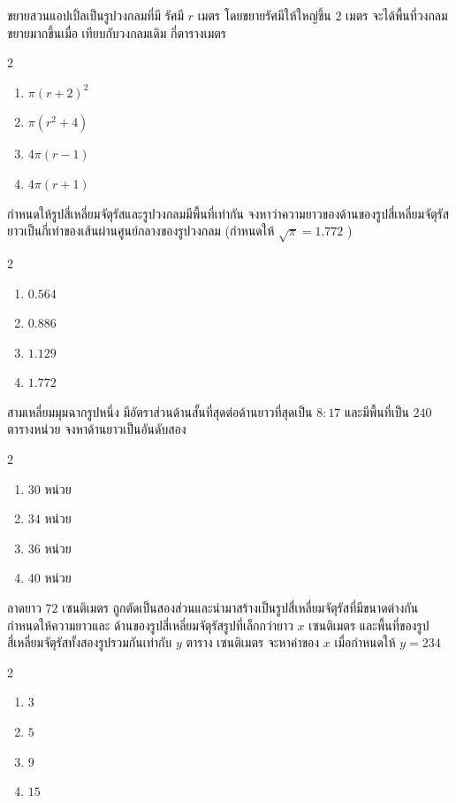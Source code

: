 \newpage
\begin{examplebox}
ขยายสวนแอปเปิ้ลเป็นรูปวงกลมที่มี รัศมี $r$ เมตร โดยขยายรัศมีให้ใหญ่ขึ้น $2$ เมตร จะได้พื้นที่วงกลมขยายมากขึ้นเมื่อ เทียบกับวงกลมเดิม กี่ตารางเมตร
\begin{multicols}{2} \begin{enumerate}
\item $\pi(r+2)^2$
\item $\pi\left(r^2+4\right)$
\item $4 \pi(r-1)$
\item $4 \pi(r+1)$
\end{enumerate} \end{multicols}
\end{examplebox}
\vspace{7cm}
\begin{examplebox}  
กำหนดให้รูปสี่เหลี่ยมจัตุรัสและรูปวงกลมมีพื้นที่เท่ากัน จงหาว่าความยาวของด้านของรูปสี่เหลี่ยมจัตุรัสยาวเป็นกี่เท่าของเส้นผ่านศูนย์กลางของรูปวงกลม (กำหนดให้ $\sqrt{\pi}=1.772$ )
\begin{multicols}{2} \begin{enumerate}
\item $0.564$
\item $ 0.886$
\item $1.129$
\item $1.772$
\end{enumerate} \end{multicols}
\end{examplebox}
\newpage

\begin{examplebox}
สามเหลี่ยมมุมฉากรูปหนึ่ง มีอัตราส่วนด้านสั้นที่สุดต่อด้านยาวที่สุดเป็น $8: 17$ และมีพื้นที่เป็น $240$ ตารางหน่วย จงหาด้านยาวเป็นอันดับสอง
\begin{multicols}{2} \begin{enumerate}
\item $30$ หน่วย
\item $34$ หน่วย
\item $36$ หน่วย
\item $40$ หน่วย
\end{enumerate} \end{multicols}
\end{examplebox}
\vspace{7cm}

\begin{examplebox}
ลาดยาว $72$ เซนติเมตร ถูกตัดเป็นสองส่วนและนำมาสร้างเป็นรูปสี่เหลี่ยมจัตุรัสที่มีขนาดต่างกัน กำหนดให้ความยาวและ ด้านของรูปสี่เหลี่ยมจัตุรัสรูปที่เล็กกว่ายาว $x$ เซนติเมตร และพื้นที่ของรูปสี่เหลี่ยมจัตุรัสทั้งสองรูปรวมกันเท่ากับ $y$ ตาราง เซนติเมตร จะหาค่าของ $x$ เมื่อกำหนดให้ $y=234$
\begin{multicols}{2} \begin{enumerate}
\item $3$
\item $5$
\item $9$
\item $15$
\end{enumerate} \end{multicols}
\end{examplebox}
\newpage

